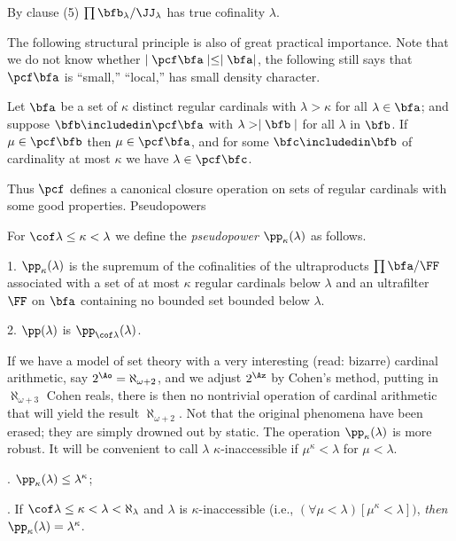 By clause (5) $\prod\bfb_\lambda/\JJ_\lambda$ has true 
cofinality $\lambda$.
 
The following structural principle is also of great 
practical
importance.
 Note that we do not know whether
   $\mid \pcf\bfa \mid   \le \mid \bfa|$, 
the following still says that $ \pcf\bfa$ is ``small,''
``local,'' has small density character.
 
 Let  $\bfa$ be 
a set of $\kappa$ distinct
 regular cardinals with $\lambda>\kappa$ for all 
$\lambda\in \bfa$\RM;
and suppose $\bfb\includedin \pcf \bfa$ with $\lambda>\mid 
\bfb\mid $ for all
$\lambda$ in $\bfb$. If $\mu\in \pcf \bfb$ then 
$\mu\in\pcf\bfa$, and
for some $\bfc\includedin\bfb$ of cardinality at most 
$\kappa$ we have
$\lambda\in \pcf\bfc$.
\endproclaim
 
Thus $\pcf$ defines a canonical closure operation on sets 
of regular
cardinals with some good properties.
{} Pseudopowers\endheading
 
For $\cof \lambda\le \kappa<\lambda$ we define the {\it 
pseudopower\/}
$\pp_\kappa(\lambda)$ as follows.
 
1. $\pp_\kappa(\lambda)$ is the supremum of the 
cofinalities of
the ultraproducts
$\prod\bfa/\FF$ associated with a set of at most $\kappa$ 
regular
cardinals below $\lambda$ and an ultrafilter $\FF$ on $\bfa$
containing no bounded set bounded below $\lambda$.

2. $\pp(\lambda)$ is $\pp_{\cof\lambda}(\lambda)$.
 
If we have a model of set theory with a very interesting 
(read:
bizarre) cardinal arithmetic, say $2^{\Ao}=\aleph_{\omega+
2}$, and
we adjust $2^{\Az}$ by Cohen's method, putting in 
$\aleph_{\omega+3}$
Cohen reals, there is then no nontrivial operation of 
cardinal arithmetic that
will yield the result $\aleph_{\omega+2}$.  Not that the 
original
phenomena have been erased; they are simply drowned out by 
static. The
operation $\pp_\kappa(\lambda)$ is more robust. It will be 
convenient
to call $\lambda$ $\kappa$-inaccessible if 
$\mu^\kappa<\lambda$ for
$\mu<\lambda$.
 
. $\pp_\kappa(\lambda)\le \lambda^\kappa$\RM;

. If $\cof \lambda\le \kappa<\lambda<\aleph_\lambda$ and
$\lambda$ is $\kappa$-inaccessible
\RM(i.e., $(\forall\mu<\lambda)[\mu^\kappa<\lambda])$, 
{\it then}
$\pp_\kappa(\lambda)=\lambda^\kappa$.
\endproclaim
 
